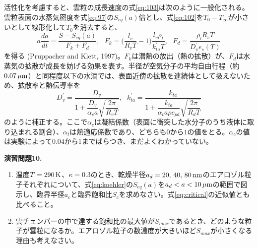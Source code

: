 \documentclass{ltjsarticle}
\begin{document}
活性化を考慮すると、雲粒の成長速度の式\eqref{eq:103}は次のように一般化される。雲粒表面の水蒸気密度を式\eqref{eq:97}の$S_{eq}(a)$倍とし、式\eqref{eq:102}を$T_{0}-T_{\infty}$が小さいとして線形化して$T_{0}$を消去すると、
\begin{equation}\label{eq:growth_general}
a\frac{da}{dt} = \frac{S-S_{eq}(a)}{F_{k}+F_{d}},\ \ \ F_{k}={\bigg (}\frac{l_{v}}{R_{v}T}-1{\bigg )}\frac{l_{v}\rho_{l}}{k_{ta}^{\prime}T},\ \ \ F_{d}=\frac{\rho_{l}R_{v}T}{D_{v}^{\prime}e_{s}(T)}
\end{equation}
を得る (Pruppacher and Klett, 1997)。$F_{k}$は潜熱の放出（熱の拡散）が、$F_{d}$は水蒸気の拡散が成長を妨げる効果を表す。半径が空気分子の平均自由行程（約$0.07\,\rm \mu m$）と同程度以下の水滴では、表面近傍の拡散を連続体として扱えないため、拡散率と熱伝導率を
\begin{equation}\label{eq:kinetic}
D_{v}^{\prime}=\frac{D_{v}}{1+\dfrac{D_{v}}{\alpha_{c}a}\sqrt{\dfrac{2\pi}{R_{v}T}}},\ \ \
k_{ta}^{\prime}=\frac{k_{ta}}{1+\dfrac{k_{ta}}{\alpha_{t}a\rho c_{pd}}\sqrt{\dfrac{2\pi}{R_{d}T}}}
\end{equation}
のように補正する。ここで$\alpha_{c}$は凝結係数（表面に衝突した水分子のうち液体に取り込まれる割合）、$\alpha_{t}$は熱適応係数であり、どちらも$0$から$1$の値をとる。$\alpha_{c}$の値は実験によって$0.04$から$1$までばらつき、まだよくわかっていない。
\leavevmode \\
\begin{itembox}[l]{\bf{演習問題10.}}
\begin{enumerate}
\item 温度$T=290\,\rm K$、$\kappa=0.3$のとき、乾燥半径$a_{d}=20,\,40,\,80\,\rm nm$のエアロゾル粒子それぞれについて、式\eqref{eq:koehler}の$S_{eq}(a)$を$a_{d}<a<10\,\rm \mu m$の範囲で図示し、臨界半径$a_{c}$と臨界飽和比$S_{c}$を求めなさい。式\eqref{eq:critical}の近似値とも比べること。
\item 雲チェンバーの中で達する飽和比の最大値が$S_{max}$であるとき、どのような粒子が雲粒になるか。エアロゾル粒子の数濃度が大きいほど$S_{max}$が小さくなる理由も考えなさい。
\end{enumerate}
\end{itembox}
\end{document}
